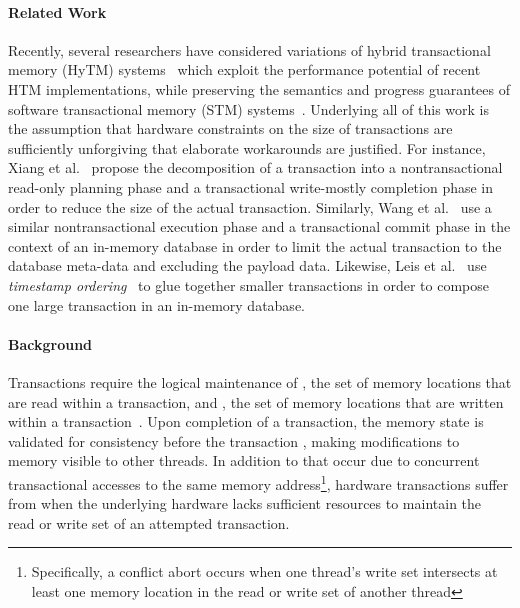 \paragraph{Related Work}
Recently, several researchers have considered variations 
of hybrid transactional memory (HyTM) 
systems~\cite{DamronFeLe06,DalessandroSpSc10,MatveevSh15}
which exploit the performance potential of recent HTM
implementations, while preserving the semantics and
progress guarantees of software transactional memory (STM)
systems~\cite{ShavitTo95}.  Underlying
all of this work is the assumption that hardware constraints
on the size of transactions are sufficiently unforgiving
that elaborate workarounds are justified.  For instance, Xiang et 
al.~\cite{XiangSc15,XiangSc13} propose the decomposition of
a transaction into a nontransactional read-only 
planning phase and a transactional write-mostly 
completion phase in order to reduce the size of the
actual transaction.  Similarly, Wang et al.~\cite{WangQiLi14} 
use a similar nontransactional execution phase
and a transactional commit phase in the context
of an in-memory database in order to limit the
actual transaction to the database meta-data and 
excluding the payload data.
Likewise, Leis et al.~\cite{LeisKeNe14}
use \emph{timestamp ordering}~\cite{Carey83} to glue together
smaller transactions in order to compose one large
transaction in an in-memory database.  

\paragraph{Background}
Transactions require the logical 
maintenance of , the set
of memory locations that are read within a 
transaction, and , the set
of memory locations that are written within 
a transaction~\cite{HerlihyMo93}. Upon 
completion of a transaction, the memory state is validated for 
consistency before the transaction
, making modifications to memory 
visible to other threads.  In addition to 
that occur due to concurrent transactional accesses
to the same memory address\footnote{Specifically,
a conflict abort occurs when one thread's write set 
intersects at least one memory location in the 
read or write set of another thread}, hardware transactions suffer 
from  when the underlying hardware
lacks sufficient resources to maintain the
read or write set of an attempted transaction.

